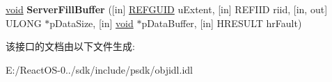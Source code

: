 \begin{DoxyCompactItemize}
\item 
\mbox{\label{interface_i_channel_hook_ae6a56816ee191f6d092f9e25a35a24f9}} 
\hyperlink{interfacevoid}{void} {\bfseries Server\+Fill\+Buffer} (\mbox{[}in\mbox{]} \hyperlink{struct___g_u_i_d}{R\+E\+F\+G\+U\+ID} u\+Extent, \mbox{[}in\mbox{]} R\+E\+F\+I\+ID riid, \mbox{[}in, out\mbox{]} U\+L\+O\+NG $\ast$p\+Data\+Size, \mbox{[}in\mbox{]} \hyperlink{interfacevoid}{void} $\ast$p\+Data\+Buffer, \mbox{[}in\mbox{]} H\+R\+E\+S\+U\+LT hr\+Fault)
\end{DoxyCompactItemize}


该接口的文档由以下文件生成\+:\begin{DoxyCompactItemize}
\item 
E\+:/\+React\+O\+S-\/0../sdk/include/psdk/objidl.\+idl\end{DoxyCompactItemize}
